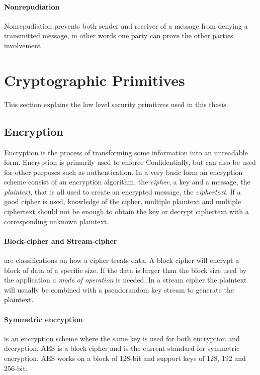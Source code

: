 \documentclass[pdftex,english,10pt,b5paper,twoside]{book}
\begin{document}
\paragraph{Nonrepudiation} Nonrepudiation prevents both sender and receiver of
a message from denying a transmitted message, in other words one party can
prove the other parties involvement \cite{stallings}.

\section{Cryptographic Primitives}

This section explains the low level security primitives used in this thesis.

\subsection{Encryption}

Encryption is the process of transforming some information into an unreadable
form. Encryption is primarily used to enforce Confidentially, but can also be
used for other purposes such as authentication.  In a very basic form an
encryption scheme consist of an encryption algorithm, the \emph{cipher}, a key
and a message, the \emph{plaintext}, that is all used to create an encrypted
message, the \emph{ciphertext}. If a good cipher is used, knowledge of the
cipher, multiple plaintext and multiple ciphertext should not be enough to
obtain the key or decrypt ciphertext with a corresponding unknown
plaintext\cite[p. 30]{stallings}.

\paragraph{Block-cipher and Stream-cipher} are classifications on how a cipher
treats data\cite[p. 32]{stallings}. A block cipher will encrypt a block of data
of a specific size. If the data is larger than the block size used by the
application a \emph{mode of operation} is needed. In a stream cipher the
plaintext will usually be combined with a pseudorandom key stream to generate
the plaintext.

\paragraph{Symmetric encryption} is an encryption scheme where the same key is
used for both encryption and decryption\cite[p. 32]{stallings}. \ac{AES} is a
block cipher and is the current standard for symmetric encryption. \ac{AES}
works on a block of 128-bit and support keys of 128, 192 and 256-bit.
\end{document}
